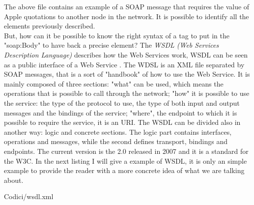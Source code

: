 \medskip

The above file contains an example of a SOAP message that requires the value of Apple quotations to another node in the network. It is possible to identify all the elements previously described. \\ 
But, how can it be possible to know the right syntax of a tag to put in the "soap:Body" to have back a precise element? The \textit{WSDL (Web Services Description Language)} describes how the Web Services work, WSDL can be seen as a public interface of a Web Service \cite{curbera2002unraveling}. The WDSL is an XML file separated by SOAP messages, that is a sort of "handbook" of how to use the Web Service. It is mainly composed of three sections: "what" can be used, which means the operations that is possible to call through the network; "how" it is possible to use the service: the type of the protocol to use, the type of both input and output messages and the bindings of the service; "where", the endpoint to which it is possible to require the service, it is an URI. The WSDL can be divided also in another way: logic and concrete sections. The logic part contains interfaces, operations and messages, while the second  defines transport, bindings and endpoints. The current version is the 2.0 released in 2007 and it is a standard for the W3C. In the next listing I will give a example of WSDL, it is only an simple example to provide the reader with a more concrete idea of what we are talking about.\\

\begin{lstinputlisting}[
		language=XML,
    morekeywords={ciao,definitions,message,part,input,output,soap:operation,soap:body,service,documentation,soap:address,port,portType,operation,binding,soap:binding,bye},
		caption={WSDL file example},
		label=lst:soap]
		{Codici/wsdl.xml}
\end{lstinputlisting}

\medskip

